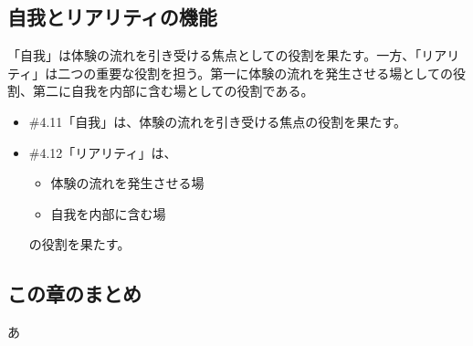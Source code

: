 \subsection{自我とリアリティの機能}\label{ux81eaux6211ux3068ux30eaux30a2ux30eaux30c6ux30a3ux306eux6a5fux80fd}

「自我」は体験の流れを引き受ける焦点としての役割を果たす。一方、「リアリティ」は二つの重要な役割を担う。第一に体験の流れを発生させる場としての役割、第二に自我を内部に含む場としての役割である。

\begin{note}{}
  \begin{itemize}
    \tightlist
    \item{\#4.11}「自我」は、体験の流れを引き受ける焦点の役割を果たす。
    \item{\#4.12}「リアリティ」は、
      \begin{itemize}
        \tightlist
        \item 体験の流れを発生させる場
        \item 自我を内部に含む場
      \end{itemize}の役割を果たす。
  \end{itemize}
\end{note}

\subsection{この章のまとめ}\label{ux3053ux306eux7ae0ux306eux307eux3068ux3081}

あ
